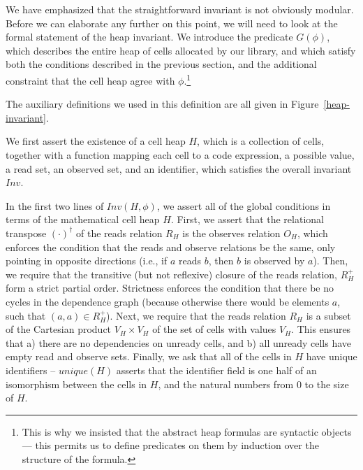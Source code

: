 \documentclass[preprint,natbib]{sigplanconf}
\begin{document}
We have emphasized that the straightforward invariant is not obviously
modular. Before we can elaborate any further on this point, we will
need to look at the formal statement of the heap invariant. We
introduce the predicate $G(\phi)$, which describes the entire heap of
cells allocated by our library, and which satisfy both the conditions
described in the previous section, and the additional constraint that
the cell heap agree with $\phi$.\footnote{This is why we insisted that
  the abstract heap formulas are syntactic objects --- this permits us
  to define predicates on them by induction over the structure of the
formula.}



The auxiliary definitions we used in this definition are all given in
Figure~\ref{heap-invariant}. 

We first assert the existence of a cell heap $H$, which is a
collection of cells, together with a function mapping each cell to a
code expression, a possible value, a read set, an observed set, and an
identifier, which satisfies the overall invariant $Inv$.

In the first two lines of $Inv(H, \phi)$, we assert all of the global 
conditions in terms of the mathematical cell heap $H$. First, we assert that 
the relational transpose $(\cdot)^\dagger$ of the reads relation $R_H$ is the
observes relation $O_H$, which enforces the condition that the reads
and observe relations be the same, only pointing in opposite
directions (i.e., if $a$ reads $b$, then $b$ is observed by
$a$). Then, we require that the transitive (but not reflexive) closure
of the reads relation, $R^+_H$ form a strict partial order. Strictness
enforces the condition that there be no cycles in the dependence graph
(because otherwise there would be elements $a$, such that $(a, a) \in
R^+_H$).  Next, we require that the reads relation $R_H$ is a subset of
the Cartesian product $V_H \times V_H$ of the set of cells with values
$V_H$. This ensures that a) there are no dependencies on unready
cells, and b) all unready cells have empty read and observe
sets. Finally, we ask that all of the cells in $H$ have unique
identifiers -- $unique(H)$ asserts that the identifier field is one
half of an isomorphism between the cells in $H$, and the natural
numbers from 0 to the size of $H$.
\end{document}
